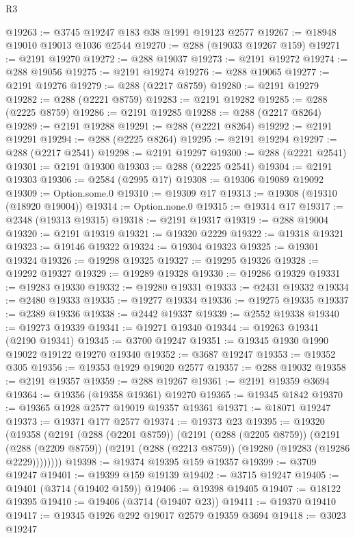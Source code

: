 \begin{lexlean}{R3}
\begin{coremodule}
@19263 := @3745 @19247 @183 @38 @1991 @19123 @2577
@19267 := @18948 @19010 @19013 @1036 @2544
@19270 := @288 (@19033 @19267 @159)
@19271 := @2191 @19270
@19272 := @288 @19037
@19273 := @2191 @19272
@19274 := @288 @19056
@19275 := @2191 @19274
@19276 := @288 @19065
@19277 := @2191 @19276
@19279 := @288 (@2217 @8759)
@19280 := @2191 @19279
@19282 := @288 (@2221 @8759)
@19283 := @2191 @19282
@19285 := @288 (@2225 @8759)
@19286 := @2191 @19285
@19288 := @288 (@2217 @8264)
@19289 := @2191 @19288
@19291 := @288 (@2221 @8264)
@19292 := @2191 @19291
@19294 := @288 (@2225 @8264)
@19295 := @2191 @19294
@19297 := @288 (@2217 @2541)
@19298 := @2191 @19297
@19300 := @288 (@2221 @2541)
@19301 := @2191 @19300
@19303 := @288 (@2225 @2541)
@19304 := @2191 @19303
@19306 := @2584 (@2995 @17)
@19308 := @19306 @19089 @19092
@19309 := Option.some.{0}
@19310 := @19309 @17
@19313 := @19308 (@19310 (@18920 @19004))
@19314 := Option.none.{0}
@19315 := @19314 @17
@19317 := @2348 (@19313 @19315)
@19318 := @2191 @19317
@19319 := @288 @19004
@19320 := @2191 @19319
@19321 := @19320 @2229
@19322 := @19318 @19321
@19323 := @19146 @19322
@19324 := @19304 @19323
@19325 := @19301 @19324
@19326 := @19298 @19325
@19327 := @19295 @19326
@19328 := @19292 @19327
@19329 := @19289 @19328
@19330 := @19286 @19329
@19331 := @19283 @19330
@19332 := @19280 @19331
@19333 := @2431 @19332
@19334 := @2480 @19333
@19335 := @19277 @19334
@19336 := @19275 @19335
@19337 := @2389 @19336
@19338 := @2442 @19337
@19339 := @2552 @19338
@19340 := @19273 @19339
@19341 := @19271 @19340
@19344 := @19263 @19341 (@2190 @19341)
@19345 := @3700 @19247
@19351 := @19345 @1930 @1990 @19022 @19122 @19270 @19340
@19352 := @3687 @19247
@19353 := @19352 @305
@19356 := @19353 @1929 @19020 @2577
@19357 := @288 @19032
@19358 := @2191 @19357
@19359 := @288 @19267
@19361 := @2191 @19359 @3694
@19364 := @19356 (@19358 @19361) @19270
@19365 := @19345 @1842
@19370 := @19365 @1928 @2577 @19019 @19357 @19361
@19371 := @18071 @19247
@19373 := @19371 @177 @2577
@19374 := @19373 @23
@19395 := @19320
    (@19358
      (@2191
        (@288 (@2201 @8759))
        (@2191
          (@288 (@2205 @8759))
          (@2191
            (@288 (@2209 @8759))
            (@2191 (@288 (@2213 @8759)) (@19280 (@19283 (@19286 @2229))))))))
@19398 := @19374 @19395 @159 @19357
@19399 := @3709 @19247
@19401 := @19399 @159 @19139
@19402 := @3715 @19247
@19405 := @19401 (@3714 (@19402 @159))
@19406 := @19398 @19405
@19407 := @18122 @19395
@19410 := @19406 (@3714 (@19407 @23))
@19411 := @19370 @19410
@19417 := @19345 @1926 @292 @19017 @2579 @19359 @3694
@19418 := @3023 @19247

\end{coremodule}
\end{lexlean}
